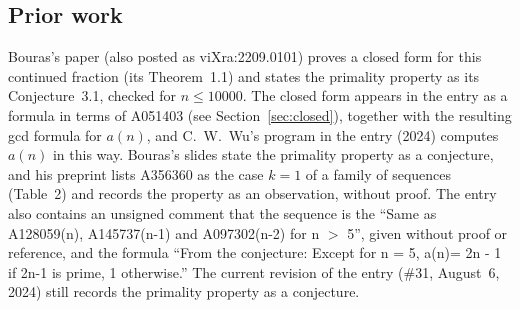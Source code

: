 \documentclass[11pt]{amsart}
\theoremstyle{plain}
\theoremstyle{definition}
\begin{document}
\subsection*{Prior work}
Bouras's paper \cite{Bz} (also posted as viXra:2209.0101) proves a closed form for this continued fraction (its Theorem~1.1) and states the primality property as its Conjecture~3.1, checked for $n\le10000$. The closed form appears in the entry as a formula in terms of A051403 \cite{A051403} (see Section~\ref{sec:closed}), together with the resulting gcd formula for $a(n)$, and C.~W.~Wu's program in the entry (2024) computes $a(n)$ in this way. Bouras's slides \cite{Bslides} state the primality property as a conjecture, and his preprint \cite{Barxiv} lists A356360 as the case $k=1$ of a family of sequences (Table~2) and records the property as an observation, without proof. The entry also contains an unsigned comment that the sequence is the ``Same as A128059(n), A145737(n-1) and A097302(n-2) for n $>$ 5'', given without proof or reference, and the formula ``From the conjecture: Except for n = 5, a(n)= 2n - 1 if 2n-1 is prime, 1 otherwise.'' The current revision of the entry (\#31, August~6, 2024) still records the primality property as a conjecture.
\end{document}
